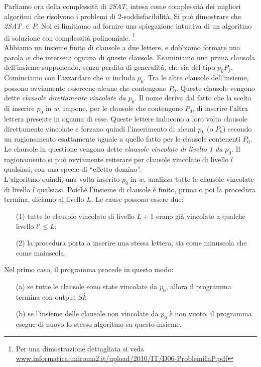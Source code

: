 \documentclass[12pt,a4paper]{report}
\theoremstyle{definition}
\begin{document}
Parliamo ora della complessità di \emph{2SAT}, intesa come complessità dei migliori algoritmi che risolvono i problemi di 2-soddisfacibilità. Si può dimostrare che \emph{2SAT} $\in P$. Noi ci limitiamo ad fornire una spiegazione intuitiva di un algoritmo di soluzione con complessità polinomiale. \footnote{Per una dimostrazione dettagliata si veda \url{www.informatica.uniroma2.it/upload/2010/IT/D06-ProblemiInP.pdf}}\\
Abbiamo un insieme finito di clausole a due lettere, e dobbiamo formare una parola $w$ che interseca ognuna di queste clausole. Esaminiamo una prima clausola dell'insieme supponendo, senza perdita di generalità, che sia del tipo $p_0 P_j$. Cominciamo con l'azzardare che $w$ includa $p_0$. Tra le altre clausole dell'insieme, possono ovviamente essercene alcune che contengono $P_0$. Queste clausole vengono dette \emph{clausole direttamente vincolate da $p_0$}. Il nome deriva dal fatto che la scelta di inserire $p_0$ in $w$, impone, per le clausole che contengono $P_0$, di inserire l'altra lettera presente in ognuna di esse. Queste lettere inducono a loro volta clausole direttamente vincolate e forzano quindi l'inserimento di alcuni $p_k$ (o $P_k$) secondo un ragionamento esattamente uguale a quello fatto per le clausole contenenti $P_0$. Le clausole in questione vengono dette \emph{clausole vincolate di livello 1 da $p_0$}. Il ragionamento si può ovviamente reiterare per clausole vincolate di livello $l$ qualsiasi, con una specie di ``effetto domino''.\\
L'algoritmo quindi, una volta inserito $p_0$ in $w$, analizza tutte le clausole vincolate di livello $l$ qualsiasi. Poiché l'insieme di clausole è finito, prima o poi la procedura termina, diciamo al livello $L$. Le cause possono essere due:
\begin{enumerate}
\item[(1)] tutte le clausole vincolate di livello $L+1$ erano già vincolate a qualche livello $l' \leq L$;
\item[(2)] la procedura porta a inserire una stessa lettera, sia come minuscola che come maiuscola.
\end{enumerate}
Nel primo caso, il programma procede in questo modo:
\begin{enumerate}
\item[(a)] se tutte le clausole sono state vincolate da $p_0$, allora il programma termina con output \emph{SÌ};
\item[(b)] se l'insieme delle clausole non vincolate da $p_0$ è non vuoto, il programma esegue di nuovo lo stesso algoritmo su questo insieme.
\end{enumerate}
\end{document}

